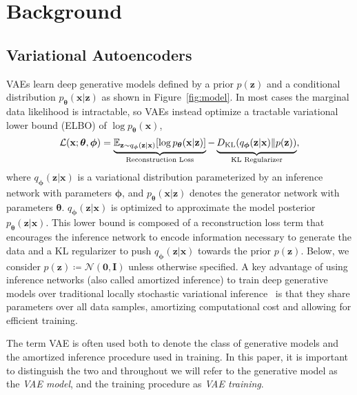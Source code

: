 \documentclass{article} \usepackage{iclr2019_conference,times}
\def\rvx{{\mathbf{x}}}
\def\rvz{{\mathbf{z}}}
\def\vtheta{{\bm{\theta}}}
\def\vphi{{\bm{\phi}}}
\def\mI{{\bm{I}}}
\def\gN{{\mathcal{N}}}
\newcommand{\E}{\mathbb{E}}
\newcommand{\Ls}{\mathcal{L}}
\newcommand{\KL}{D_{\mathrm{KL}}}
\newcommand{\Eq}{\E_{\rvz\sim q_{\vphi}(\rvz|\rvx)}}
\newcommand{\qzx}{q_{\vphi}(\rvz|\rvx)}
\newcommand{\pzx}{p_{\vtheta}(\rvz|\rvx)}
\newcommand{\pxz}{p_{\vtheta}(\rvx|\rvz)}
\newcommand{\pz}{p(\rvz)}
\begin{document}
\section{Background}
\subsection{Variational Autoencoders}
\label{sec:vae-bg}
VAEs learn deep generative models defined by a prior $\pz$ and a conditional distribution $\pxz$ as shown in Figure~\ref{fig:model}. In most cases the marginal data likelihood is intractable,
so VAEs instead optimize a tractable variational lower bound (ELBO) of $\log p_{\vtheta}(\rvx)$,
\begin{equation}
\label{eq:elbo-1}
\Ls (\rvx;\vtheta, \vphi) = \underbrace{\Eq[\log \pxz]}_{\textrm{Reconstruction Loss}} - \underbrace{\vphantom{\Eq[\log \pxz]} \KL(\qzx\| p(\rvz))}_{\textrm{KL Regularizer}},
\end{equation}
where $\qzx$ is a variational distribution parameterized by an inference network with parameters $\vphi$, and $\pxz$ denotes the generator network with parameters $\vtheta$. $\qzx$ is optimized to approximate the model posterior $\pzx$. This lower bound is composed of a reconstruction loss term that encourages the inference network to encode information necessary to generate the data and a KL regularizer to push $\qzx$ towards the prior $p(\rvz)$. Below, we consider $\pz \coloneqq \gN(\bm{0}, \mI)$ unless otherwise specified. A key advantage of using inference networks (also called amortized inference) to train deep generative models over traditional locally stochastic variational inference~\citep{hoffman2013stochastic} is that they share parameters over all data samples, 
amortizing computational cost and allowing for efficient training.

The term VAE is often used both to denote the class of generative models and the amortized inference procedure used in training. 
In this paper, it is important to distinguish the two and throughout we will refer to the generative model as the \textit{VAE model},
and the training procedure as \textit{VAE training}.
\end{document}
